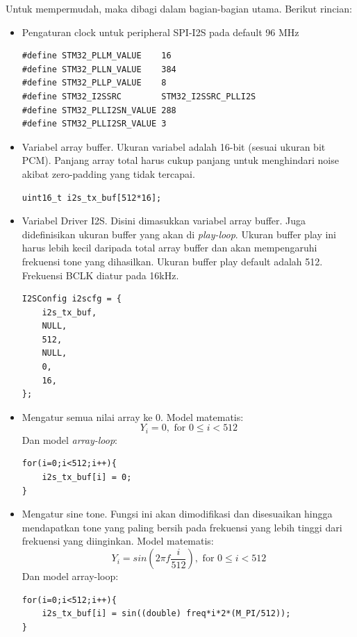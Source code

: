 \documentclass[12pt,]{article}
\begin{document}
	Untuk mempermudah, maka dibagi dalam bagian-bagian utama.
	Berikut rincian:
	\begin{itemize}
		\item Pengaturan clock untuk peripheral SPI-I2S pada default 96 MHz
		\begin{verbatim}
#define STM32_PLLM_VALUE    16
#define STM32_PLLN_VALUE    384
#define STM32_PLLP_VALUE    8
#define STM32_I2SSRC        STM32_I2SSRC_PLLI2S
#define STM32_PLLI2SN_VALUE 288
#define STM32_PLLI2SR_VALUE 3
		\end{verbatim}
		
		\item Variabel array buffer.
		Ukuran variabel adalah 16-bit (sesuai ukuran bit PCM).
		Panjang array total harus cukup panjang untuk menghindari
		noise akibat zero-padding yang tidak tercapai. 
		\begin{verbatim}
uint16_t i2s_tx_buf[512*16];
		\end{verbatim}
		
		\item Variabel Driver I2S.
		Disini dimasukkan variabel array buffer.
		Juga didefinisikan ukuran buffer yang akan di \textit{play-loop}.
		Ukuran buffer play ini harus lebih kecil daripada total array buffer
		dan akan mempengaruhi frekuensi tone yang dihasilkan.
		Ukuran buffer play default adalah 512.
		Frekuensi BCLK diatur pada 16kHz.
		\begin{verbatim}
I2SConfig i2scfg = {
	i2s_tx_buf,
	NULL,
	512,
	NULL,
	0,
	16,
};
		\end{verbatim}
		
		\newpage
		\item Mengatur semua nilai array ke 0.
		Model matematis:
		\[ Y_i = 0, \text{ for } 0 \leq i < 512 \]
		Dan model \textit{array-loop}:
		\begin{verbatim}
for(i=0;i<512;i++){
	i2s_tx_buf[i] = 0;
}
		\end{verbatim}
		
		\item Mengatur sine tone.
		Fungsi ini akan dimodifikasi dan disesuaikan hingga mendapatkan
		tone yang paling bersih pada frekuensi yang lebih tinggi
		dari frekuensi yang diinginkan.
		Model matematis:
		\[ Y_i = sin(2\pi f \frac{i}{512}), \text{ for } 0 \leq i < 512 \]
		Dan model array-loop:
		\begin{verbatim}
for(i=0;i<512;i++){
	i2s_tx_buf[i] = sin((double) freq*i*2*(M_PI/512));
}
		\end{verbatim}
		

\end{itemize}
\end{document}
